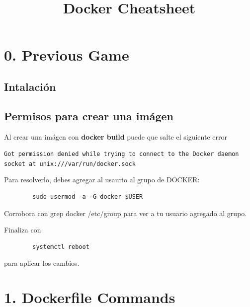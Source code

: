 \documentclass[a4paper,10pt]{article}
\title{Docker Cheatsheet}
\date{}
\begin{document}
\maketitle


\section*{0. Previous Game}
\subsection*{Intalación}

\subsection*{Permisos para crear una imágen}
Al crear una imágen con \textbf{docker build} puede que salte el siguiente error
\begin{center}
    \texttt{Got permission denied while trying to connect to the Docker daemon socket at unix:///var/run/docker.sock}
\end{center}
Para resolverlo, debes agregar al usaurio al grupo de DOCKER:
\begin{center}
    \begin{lstlisting}
        sudo usermod -a -G docker $USER   
    \end{lstlisting}
\end{center}


Corrobora con grep docker /etc/group para ver a tu usuario agregado al grupo.

Finaliza con  
\begin{center}
    \begin{lstlisting}
        systemctl reboot
    \end{lstlisting}
\end{center}

para aplicar los cambios.


\section*{1. Dockerfile Commands}
\end{document}
